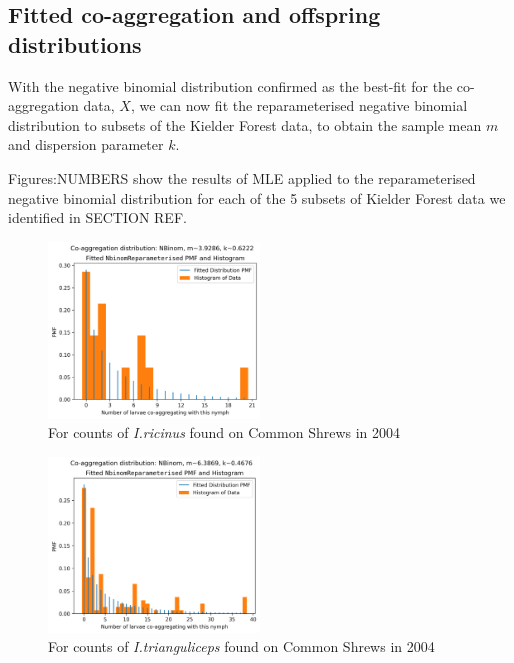 \documentclass{article}
\begin{document}
\subsection{Fitted co-aggregation and offspring distributions}

With the negative binomial distribution confirmed as the best-fit for the co-aggregation data, $ X $, we can now fit the reparameterised negative binomial distribution to subsets of the Kielder Forest data, to obtain the sample mean $ m $ and dispersion parameter $ k $.

Figures:NUMBERS show the results of MLE applied to the reparameterised negative binomial distribution for each of the 5 subsets of Kielder Forest data we identified in SECTION REF. 

\begin{figure}[H]
	\includegraphics[width=0.5\textwidth, center]{coaggregation_dist_2004_I.ricinus_SA.png}
	\caption{For counts of \textit{I.ricinus} found on Common Shrews in 2004}\label{fig:distFit_2004_Iricinus_SA}
\end{figure}

\begin{figure}[H]
	\includegraphics[width=0.5\textwidth, center]{coaggregation_dist_2004_I.trianguliceps_SA.png}
	\caption{For counts of \textit{I.trianguliceps} found on Common Shrews in 2004}\label{fig:distFit_2004_Itrianguliceps_SA}
\end{figure}
\end{document}
